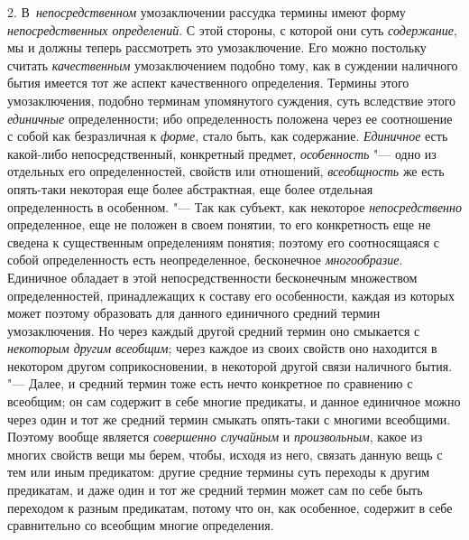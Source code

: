 2. В~{\em непосредственном}
умозаключении рассудка термины имеют форму
{\em непосредственных определений}.
С этой стороны, с которой они суть
{\em содержание}, мы и
должны теперь рассмотреть это умозаключение. Его можно постольку считать
{\em качественным}
умозаключением подобно тому, как в суждении наличного бытия
имеется тот же аспект качественного определения. Термины этого
умозаключения, подобно терминам упомянутого суждения, суть вследствие этого
{\em единичные}
определенности; ибо определенность положена через ее
соотношение с собой как безразличная к
{\em форме}, стало быть,
как содержание. {\em Единичное}
есть какой-либо непосредственный, конкретный предмет,
{\em особенность} "--- одно
из отдельных его определенностей, свойств или отношений,
{\em всеобщность} же есть
опять-таки некоторая еще более абстрактная, еще более отдельная
определенность в особенном. "--- Так как субъект, как некоторое
{\em непосредственно}
определенное, еще не положен в своем понятии, то его
конкретность еще не сведена к существенным определениям понятия; поэтому
его соотносящаяся с собой определенность есть
неопределенное, бесконечное
{\em многообразие}.
Единичное обладает в этой непосредственности бесконечным
множеством определенностей, принадлежащих к составу его особенности, каждая
из которых может поэтому образовать для данного единичного средний термин
умозаключения. Но через каждый другой средний термин оно смыкается с
{\em некоторым другим всеобщим};
через каждое из своих свойств оно находится в некотором
другом соприкосновении, в некоторой другой связи наличного бытия. "---
Далее, и средний термин тоже есть нечто конкретное по
сравнению с всеобщим; он сам содержит в себе многие предикаты, и данное
единичное можно через один и тот же средний термин смыкать опять-таки с
многими всеобщими. Поэтому вообще является
{\em совершенно случайным}
и {\em произвольным},
какое из многих свойств вещи мы берем, чтобы, исходя из него,
связать данную вещь с тем или иным предикатом: другие средние термины суть
переходы к другим предикатам, и даже один и тот же средний термин может сам
по себе быть переходом к разным предикатам, потому что он, как особенное,
содержит в себе сравнительно со всеобщим многие определения.

